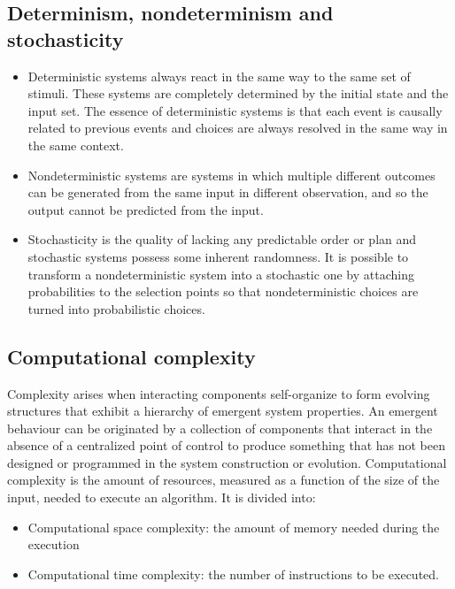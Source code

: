   \subsection{Determinism, nondeterminism and stochasticity}

  \begin{multicols}{2}
    \begin{itemize}
      \item Deterministic systems always react in the same way to the same set of stimuli.
        These systems are completely determined by the initial state and the input set.
        The essence of deterministic systems is that each event is causally related to previous events and choices are always resolved in the same way in the same context.
      \item Nondeterministic systems are systems in which multiple different outcomes can be generated from the same input in different observation, and so the output cannot be predicted from the input.
      \item Stochasticity is the quality of lacking any predictable order or plan and stochastic systems possess some inherent randomness.
        It is possible to transform a nondeterministic system into a stochastic one by attaching probabilities to the selection points so that nondeterministic choices are turned into probabilistic choices.
    \end{itemize}
  \end{multicols}


  \subsection{Computational complexity}
  Complexity arises when interacting components self-organize to form evolving structures that exhibit a hierarchy of emergent system properties.
  An emergent behaviour can be originated by a collection of components that interact in the absence of a centralized point of control to produce something that has not been designed or programmed in the system construction or evolution.
  Computational complexity is the amount of resources, measured as a function of the size of the input, needed to execute an algorithm.
  It is divided into:

  \begin{multicols}{2}
    \begin{itemize}
      \item Computational space complexity: the amount of memory needed during the execution
    \item Computational time complexity: the number of instructions to be executed.
    \end{itemize}
  \end{multicols}


